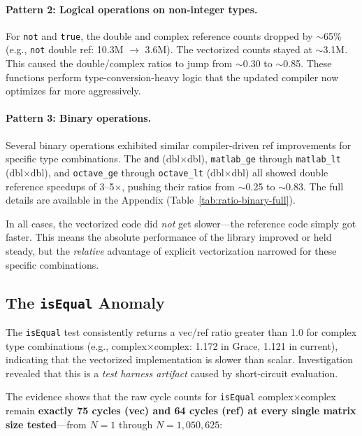 \paragraph{Pattern 2: Logical operations on non-integer types.} For \texttt{not} and \texttt{true}, the double and complex reference counts dropped by $\sim$65\% (e.g., \texttt{not} double ref: 10.3M $\rightarrow$ 3.6M). The vectorized counts stayed at $\sim$3.1M. This caused the double/complex ratios to jump from $\sim$0.30 to $\sim$0.85. These functions perform type-conversion-heavy logic that the updated compiler now optimizes far more aggressively.

\paragraph{Pattern 3: Binary operations.} Several binary operations exhibited similar compiler-driven ref improvements for specific type combinations. The \texttt{and} (dbl$\times$dbl), \texttt{matlab\_ge} through \texttt{matlab\_lt} (dbl$\times$dbl), and \texttt{octave\_ge} through \texttt{octave\_lt} (dbl$\times$dbl) all showed double reference speedups of 3--5$\times$, pushing their ratios from $\sim$0.25 to $\sim$0.83. The full details are available in the Appendix (Table~\ref{tab:ratio-binary-full}).

In all cases, the vectorized code did \emph{not} get slower---the reference code simply got faster. This means the absolute performance of the library improved or held steady, but the \emph{relative} advantage of explicit vectorization narrowed for these specific combinations.

\subsection{The \texttt{isEqual} Anomaly}

The \texttt{isEqual} test consistently returns a vec/ref ratio greater than 1.0 for complex type combinations (e.g., complex$\times$complex: 1.172 in Grace, 1.121 in current), indicating that the vectorized implementation is slower than scalar. Investigation revealed that this is a \emph{test harness artifact} caused by short-circuit evaluation.

The evidence shows that the raw cycle counts for \texttt{isEqual} complex$\times$complex remain \textbf{exactly 75 cycles (vec) and 64 cycles (ref) at every single matrix size tested}---from $N=1$ through $N=1{,}050{,}625$:

